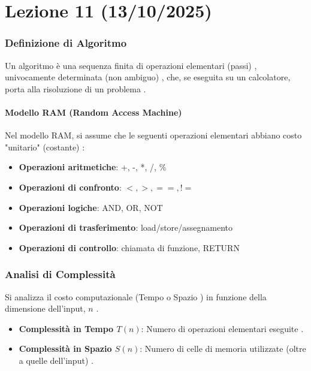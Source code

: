 
\part{Lezione 11 (13/10/2025) }

\section{Definizione di Algoritmo}
Un algoritmo è una sequenza finita di operazioni elementari (passi) , univocamente determinata (non ambiguo) , che, se eseguita su un calcolatore, porta alla risoluzione di un problema .

\subsection{Modello RAM (Random Access Machine) }
Nel modello RAM, si assume che le seguenti operazioni elementari abbiano costo "unitario" (costante) :
\begin{itemize}
    \item \textbf{Operazioni aritmetiche}: +, -, *, /, \% 
    \item \textbf{Operazioni di confronto}: $<, >, ==, !=$ 
    \item \textbf{Operazioni logiche}: AND, OR, NOT 
    \item \textbf{Operazioni di trasferimento}: load/store/assegnamento 
    \item \textbf{Operazioni di controllo}: chiamata di funzione, RETURN 
\end{itemize}

\section{Analisi di Complessità}
Si analizza il costo computazionale (Tempo o Spazio ) in funzione della dimensione dell'input, $n$ .

\begin{itemize}
    \item \textbf{Complessità in Tempo $T(n)$}: Numero di operazioni elementari eseguite .
    \item \textbf{Complessità in Spazio $S(n)$}: Numero di celle di memoria utilizzate (oltre a quelle dell'input) .
\end{itemize}

